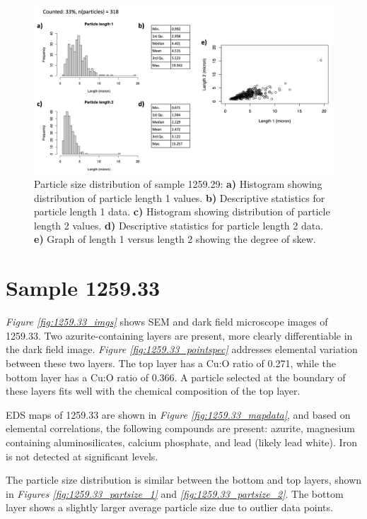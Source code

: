 \begin{figure}[H]
\centering
  \includegraphics[width=\linewidth]{1259-29_partsize}
\caption[Particle size distribution, sample 1259.29.]{Particle size distribution of sample 1259.29: \textbf{a)} Histogram showing distribution of particle length 1 values. \textbf{b)} Descriptive statistics for particle length 1 data. \textbf{c)} Histogram showing distribution of particle length 2 values. \textbf{d)} Descriptive statistics for particle length 2 data. \textbf{e)} Graph of length 1 versus length 2 showing the degree of skew.}
\label{fig:1259.29_partsize}
\end{figure}


\section{Sample 1259.33}

\textit{Figure \ref{fig:1259.33_imgs}} shows SEM and dark field microscope images of 1259.33. Two azurite-containing layers are present, more clearly differentiable in the dark field image. \textit{Figure \ref{fig:1259.33_pointspec}} addresses elemental variation between these two layers. The top layer has a Cu:O ratio of 0.271, while the bottom layer has a Cu:O ratio of 0.366. A particle selected at the boundary of these layers fits well with the chemical composition of the top layer. 

EDS maps of 1259.33 are shown in \textit{Figure \ref{fig:1259.33_mapdata}}, and based on elemental correlations, the following compounds are present: azurite, magnesium containing aluminosilicates, calcium phosphate, and lead (likely lead white). Iron is not detected at significant levels.

The particle size distribution is similar between the bottom and top layers, shown in \textit{Figures \ref{fig:1259.33_partsize_1}} and \textit{\ref{fig:1259.33_partsize_2}}. The bottom layer shows a slightly larger average particle size due to outlier data points.

